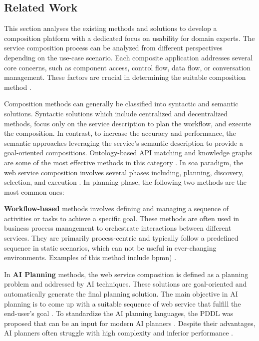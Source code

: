 \vspace{-10pt}
\hypertarget{sec:dsac-cp:related-work}{%
\subsection{Related Work}\label{sec:dsac-cp:related-work}}
\vspace{10pt}

This section analyses the existing methods and solutions to develop a composition platform with a dedicated focus on usability for domain experts.
The service composition process can be analyzed from different perspectives depending on the use-case scenario. Each composite application addresses several core concerns, such as component access, control flow, data flow, or conversation management. These factors are crucial in  determining the suitable composition method \autocite{Lemos2015}. 


Composition methods can generally be classified into syntactic and semantic solutions. Syntactic solutions which include centralized and decentralized methods, focus only on the service description to plan the workflow, and execute the composition. In contrast, to increase the accuracy and performance, the semantic approaches leveraging the service’s semantic description to provide a goal-oriented compositions. Ontology-based API matching and knowledge graphs are some of the most effective methods in this category \autocite{Kim2016}.
In \gls{soa} paradigm, the web service composition involves several phases including, planning, discovery, selection, and execution \autocite{Rao2004}. In planning phase, the following two methods are the most common ones:

\textbf{Workflow-based} methods involves defining and managing a sequence of activities or tasks to achieve a specific goal. These methods are often used in business process management to orchestrate interactions between different services. They are primarily process-centric and typically follow a predefined sequence in static scenarios, which can not be useful in ever-changing environments. Examples of this method include \gls{bpmn}) \autocite{AlSedrani2016}.

In \textbf{AI Planning} methods, the web service composition is defined as a planning problem and addressed by AI techniques. These solutions are goal-oriented and automatically generate the final planning solution. The main objective in AI planning is to come up with a suitable sequence of web service that fulfill the end-user’s goal \autocite{AlSedrani2016}. To standardize the AI planning languages, the PDDL was proposed that can be an input for modern AI planners \autocite{Purohit2020}. Despite their advantages, AI planners often struggle with high complexity and inferior performance \autocite{Lee2015}.

